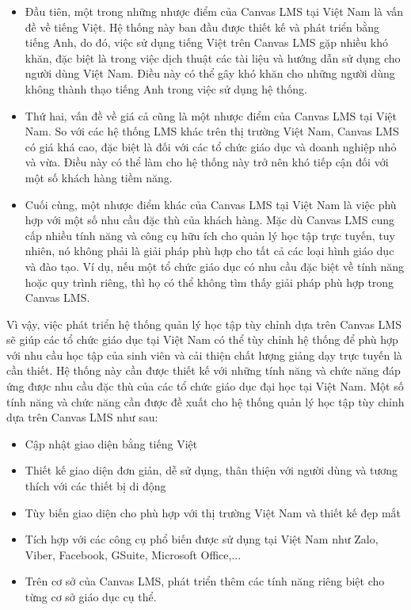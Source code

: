 \documentclass[../Thesis.tex]{subfiles}
\begin{document}
\begin{itemize}
    \item Đầu tiên, một trong những nhược điểm của Canvas LMS tại Việt Nam là vấn đề về tiếng Việt. Hệ thống này ban đầu được thiết kế và phát triển bằng tiếng Anh, do đó, việc sử dụng tiếng Việt trên Canvas LMS gặp nhiều khó khăn, đặc biệt là trong việc dịch thuật các tài liệu và hướng dẫn sử dụng cho người dùng Việt Nam. Điều này có thể gây khó khăn cho những người dùng không thành thạo tiếng Anh trong việc sử dụng hệ thống.
    \item Thứ hai, vấn đề về giá cả cũng là một nhược điểm của Canvas LMS tại Việt Nam. So với các hệ thống LMS khác trên thị trường Việt Nam, Canvas LMS có giá khá cao, đặc biệt là đối với các tổ chức giáo dục và doanh nghiệp nhỏ và vừa. Điều này có thể làm cho hệ thống này trở nên khó tiếp cận đối với một số khách hàng tiềm năng.
    \item Cuối cùng, một nhược điểm khác của Canvas LMS tại Việt Nam là việc phù hợp với một số nhu cầu đặc thù của khách hàng. Mặc dù Canvas LMS cung cấp nhiều tính năng và công cụ hữu ích cho quản lý học tập trực tuyến, tuy nhiên, nó không phải là giải pháp phù hợp cho tất cả các loại hình giáo dục và đào tạo. Ví dụ, nếu một tổ chức giáo dục có nhu cầu đặc biệt về tính năng hoặc quy trình riêng, thì họ có thể không tìm thấy giải pháp phù hợp trong Canvas LMS.
\end{itemize}

Vì vậy,  việc phát triển hệ thống quản lý học tập tùy chỉnh dựa trên Canvas LMS sẽ giúp các tổ chức giáo dục tại Việt Nam có thể tùy chỉnh hệ thống để phù hợp với nhu cầu học tập của sinh viên và cải thiện chất lượng giảng dạy trực tuyến là cần thiết. Hệ thống này cần được thiết kế với những tính năng và chức năng đáp ứng được nhu cầu đặc thù của các tổ chức giáo dục đại học tại Việt Nam. Một số tính năng và chức năng cần được đề xuất cho hệ thống quản lý học tập tùy chỉnh dựa trên Canvas LMS như sau:
\begin{itemize}
    \item Cập nhật giao diện bằng tiếng Việt
    \item Thiết kế giao diện đơn giản, dễ sử dụng, thân thiện với người dùng và tương thích với các thiết bị di động
    \item Tùy biến giao diện cho phù hợp với thị trường Việt Nam và thiết kế đẹp mắt
    \item Tích hợp với các công cụ phổ biến được sử dụng tại Việt Nam như Zalo, Viber, Facebook, GSuite, Microsoft Office,...
    \item Trên cơ sở của Canvas LMS, phát triển thêm các tính năng riêng biệt cho từng cơ sở giáo dục cụ thể.
\end{itemize}
\end{document}
